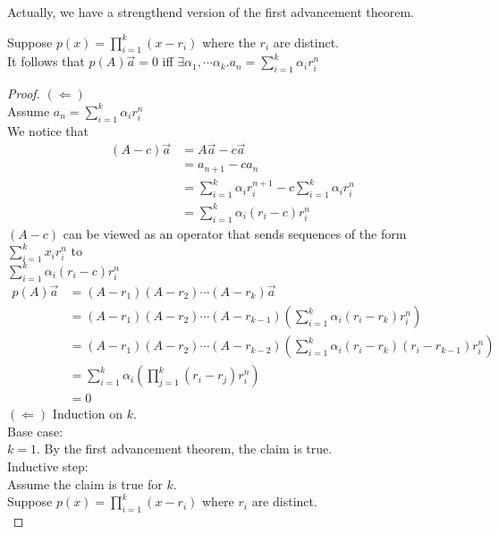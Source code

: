 \noindent Actually, we have a strengthend version of the first advancement theorem.
\begin{theorem}
    Suppose $p(x)=\prod_{i=1}^k(x-r_i)$ where the $r_i$ are distinct.\\
    It follows that $p(A)\vec{a}=0$ iff $\exists \alpha_1, \cdots \alpha_k.a_n=\sum_{i=1}^k\alpha_ir_i^n$
\end{theorem}
\begin{proof}
    $(\Leftarrow)$\\
    Assume $a_n=\sum_{i=1}^k\alpha_ir_i^n$\\
    We notice that 
    \begin{equation}
        \begin{split}
            (A-c)\vec{a} &= A\vec{a}-c\vec{a}\\
            &= a_{n+1}-ca_n\\
            &= \sum_{i=1}^k\alpha_ir_i^{n+1}-c\sum_{i=1}^k\alpha_ir_i^n\\
            &= \sum_{i=1}^k\alpha_i(r_i-c)r_i^n
        \end{split}
    \end{equation}
    $(A-c)$ can be viewed as an operator that sends sequences of the form $\sum_{i=1}^kx_ir_i^n$ to \\$\sum_{i=1}^k\alpha_i(r_i-c)r_i^n$\\
    \begin{equation}
        \begin{split}
            p(A)\vec{a} &= (A-r_1)(A-r_2)\cdots(A-r_k)\vec{a}\\
            &= (A-r_1)(A-r_2)\cdots(A-r_{k-1})(\sum_{i=1}^k\alpha_i(r_i-r_k)r_i^n)\\
            &= (A-r_1)(A-r_2)\cdots(A-r_{k-2})(\sum_{i=1}^k\alpha_i(r_i-r_k)(r_i-r_{k-1})r_i^n)\\
            &= \sum_{i=1}^k\alpha_i(\prod_{j=1}^k(r_i-r_j)r_i^n)\\
            &= 0
        \end{split}
    \end{equation}
    $(\Leftarrow)$ Induction on $k$.\\
    Base case: \\
    $k=1$. By the first advancement theorem, the claim is true.\\
    Inductive step:\\
    Assume the claim is true for $k$.\\
    Suppose $p(x)=\prod_{i=1}^k(x-r_i)$ where $r_i$ are distinct. \\

\end{proof}
